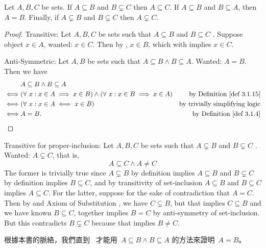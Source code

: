 \begin{proposition}  \label{prop 3.1.18}
Let \(A, B, C\) be sets. If \(A \subseteq B\) and \(B \subsetneq C\) then \(A \subseteq C\). If \(A \subseteq B\) and \(B \subseteq A\), then \(A = B\). Finally, if \(A \subsetneq B\) and \(B \subsetneq C\) then \(A \subsetneq C\).
\end{proposition}

\begin{proof}
Transitive: Let \(A, B, C\) be sets such that \(A \subseteq B\)  and \(B \subseteq C\) . Suppose object \(x \in A\), wanted: \(x \in C\). Then by , \(x \in B\), which with  implies \(x \in C\).

Anti-Symmetric: Let \(A, B\) be sets such that \(A \subseteq B \land B \subseteq A\). Wanted: \(A = B\). Then we have
\begin{align*}
     & A \subseteq B \land B \subseteq A \\
\iff & (\forall\ x : x \in A \implies x \in B) \land (\forall\ x : x \in B \implies x \in A) & \text{by \DEF{3.1.15}} \\
\iff & (\forall\ x : x \in A \iff x \in B) & \text{by trivially simplifying logic} \\
\iff & A = B. & \text{by \DEF{3.1.4}}
\end{align*}
\end{proof}

Transitive for proper-inclusion: Let \(A, B, C\) be sets such that \(A \subsetneq B\)  and \(B \subsetneq C\) . Wanted: \(A \subsetneq C\), that is,
\[
    A \subseteq C \land A \neq C
\] The former is trivially true since \(A \subsetneq B\) by definition implies \(A \subseteq B\) and \(B \subsetneq C\) by definition implies \(B \subseteq C\), and by transitivity of set-inclusion \(A \subseteq B\) and \(B \subseteq C\) implies \(A \subseteq C\). For the latter, suppose for the sake of contradiction that \(A = C\). Then by  and Axiom of Substitution , we have \(C \subsetneq B\), but that implies \(C \subseteq B\) and we have known \(B \subseteq C\), together implies \(B = C\) by anti-symmetry of set-inclusion. But this contradicts \(B \subsetneq C\) because that implies \(B \neq C\).

\begin{note}
根據本書的脈絡，我們直到\  才能用\ \(A \subseteq B \land B \subseteq A\) 的方法來證明\ \(A = B\)。
\end{note}

